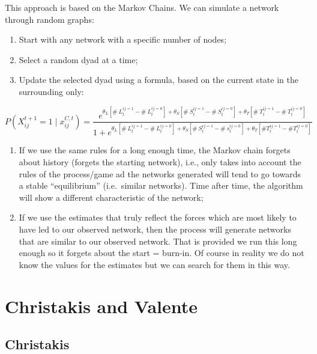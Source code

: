 \documentclass[
  notitlepage,
  onecolumn,
  openany]{book}
\providecommand{\tightlist}{%
  \setlength{\itemsep}{0pt}\setlength{\parskip}{0pt}}
\begin{document}
This approach is based on the Markov Chains. We can simulate a network through random graphs:

\begin{enumerate}
\def\labelenumi{\arabic{enumi}.}
\tightlist
\item
  Start with any network with a specific number of nodes;
\item
  Select a random dyad at a time;
\item
  Update the selected dyad using a formula, based on the current state in the surrounding only:
\end{enumerate}

\[
P\left(X_{ij}^{t+1}=1 \mid x_{ij}^{C, t}\right)= \frac{e^{\theta_{L}\left[\# ~L_{t}^{ij=1}-\# ~L_{t}^{ij=0}\right]+\theta_{S}\left[\# ~S_{t}^{ij=1}-\# ~S_{t}^{ij=0}\right]+\theta_{T}\left[\# ~T_{t}^{ij=1}-\# {~T}_{t}^{ij=0}\right]}}{1+e^{\theta_{L}\left[\# ~L_{t}^{ij=1}-\# ~L_{t}^{ij=0}\right]+\theta_{S}\left[\# ~S_{t}^{ij=1}-\# ~s_{t}^{ij=0}\right]+\theta_{T} \left[\# T_{t}^{ij=1}-\# T_{t}^{ij=0}\right]}}
\]

\begin{enumerate}
\def\labelenumi{\arabic{enumi}.}
\setcounter{enumi}{3}
\item
  If we use the same rules for a long enough time, the Markov chain forgets about history
  (forgets the starting network), i.e., only takes into account the rules of the process/game ad the networks generated will tend to go towards a stable ``equilibrium'' (i.e.~similar networks). Time after time, the algorithm will show a different characteristic of the network;
\item
  If we use the estimates that truly reflect the forces which are most likely to have led to our observed network, then the process will generate networks that are similar to our observed
  network. That is provided we run this long enough so it forgets about the start = burn-in. Of course in reality we do not know the values for the estimates but we can search for them in this way.
\end{enumerate}

\hypertarget{christakis-and-valente}{%
\chapter{Christakis and Valente}\label{christakis-and-valente}}

\hypertarget{christakis}{%
\section{Christakis}\label{christakis}}
\end{document}

